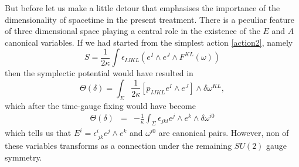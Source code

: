 \documentclass[aps, nofootinbib,superscriptaddress,12pt]{revtex4-2}
\def\be{\begin{equation}}
\def\ee{\end{equation}}
\def\ba{\begin{eqnarray}}
\def\ea{\end{eqnarray}}
\begin{document}
But before let us make a little detour that emphasises the importance of the dimensionality of spacetime in the present treatment. There is a peculiar feature of three dimensional space playing a central role in the existence of the $E$ and $A$ canonical variables.
If we had started from the simplest action \eqref{action2}, namely 
\be
S=\frac{1}{2 \kappa}\int \epsilon_{IJKL}  \left( e^I\wedge e^J\wedge F^{KL}(\omega)\right)
\ee
then the symplectic potential would have resulted in
\be\label{sympo-bis}
\Theta(\delta)=\int_{\Sigma} \frac{1}{2 \kappa}[p_{IJKL}  e^I\wedge e^J]\wedge \delta \omega^{KL},
\ee
which after the time-gauge fixing would have become
\ba\label{sympotg-bis}
\Theta(\delta)&=&
-\frac{1}{\kappa} \int_{\Sigma} \epsilon_{jkl}  e^j\wedge e^k\wedge \delta{ \omega^{i0}}
\ea
which tells us that $E^i=\epsilon^{i}_{\ jk} e^j\wedge e^k$ and $\omega^{i0}$ are canonical pairs. However, non of these variables transforms as a connection under the remaining $SU(2)$ gauge symmetry. 
\end{document}
